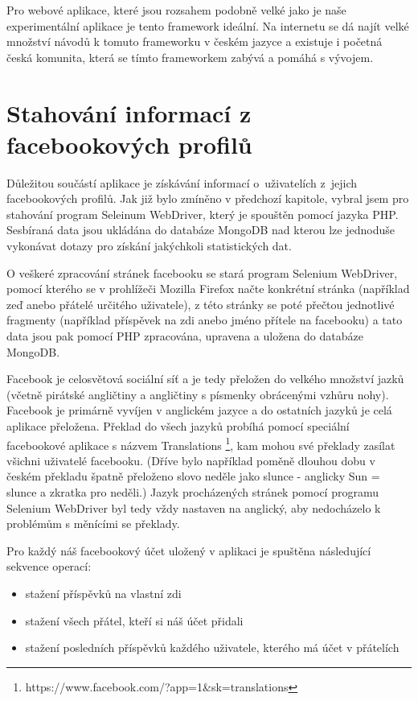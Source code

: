 \documentclass[thesis=M,czech]{FITthesis}[2013/05/10]
\begin{document}
Pro webové aplikace, které jsou rozsahem podobně velké jako je naše experimentální aplikace je tento framework ideální. Na internetu se dá najít velké množství návodů k tomuto frameworku v českém jazyce a existuje i početná česká komunita, která se tímto frameworkem zabývá a pomáhá s vývojem. 


\section{Stahování informací z facebookových profilů}

Důležitou součástí aplikace je získávání informací o~uživatelích z~jejich facebookových profilů. Jak již bylo zmíněno v předchozí kapitole, vybral jsem pro stahování program Seleinum WebDriver, který je spouštěn pomocí jazyka PHP. Sesbíraná data jsou ukládána do databáze MongoDB nad kterou lze jednoduše vykonávat dotazy pro získání jakýchkoli statistických dat.

O veškeré zpracování stránek facebooku se stará program Selenium WebDriver, pomocí kterého se v prohlížeči Mozilla Firefox načte konkrétní stránka (například zeď anebo přátelé určitého uživatele), z této stránky se poté přečtou jednotlivé fragmenty (například příspěvek na zdi anebo jméno přítele na facebooku) a tato data jsou pak pomocí PHP zpracována, upravena a uložena do databáze MongoDB. 

Facebook je celosvětová sociální síť a je tedy přeložen do velkého množství jazků (včetně pirátské angličtiny a angličtiny s písmenky obrácenými vzhůru nohy). Facebook je primárně vyvíjen v anglickém jazyce a do ostatních jazyků je celá aplikace přeložena. Překlad do všech jazyků probíhá pomocí speciální facebookové aplikace s názvem Translations \footnote{https://www.facebook.com/?app=1\&sk=translations}, kam mohou své překlady zasílat všichni uživatelé facebooku. (Dříve bylo například poměně dlouhou dobu v českém překladu špatně přeloženo slovo neděle jako slunce - anglicky Sun = slunce a zkratka pro neděli.) Jazyk procházených stránek pomocí programu Selenium WebDriver byl tedy vždy nastaven na anglický, aby nedocházelo k problémům s měnícími se překlady. 

Pro každý náš facebookový účet uložený v aplikaci je spuštěna následující sekvence operací:

\begin{itemize}
  \item stažení příspěvků na vlastní zdi
  \item stažení všech přátel, kteří si náš účet přidali
  \item stažení posledních příspěvků každého uživatele, kterého má účet v přátelích
\end{itemize}
\end{document}
